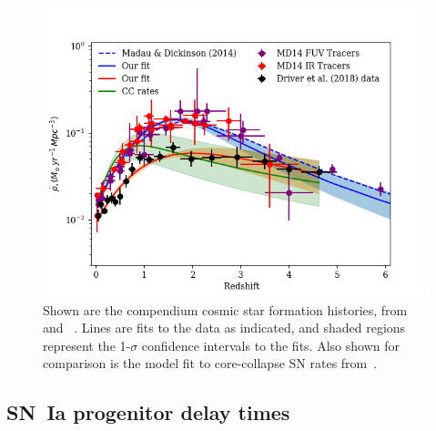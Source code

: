 \documentclass[apj]{aastex}
\begin{document}
\begin{figure}[t]
   \centering
   \includegraphics[width=6.1in]{figure_csfh_today}
   \caption{\footnotesize Shown are the compendium cosmic star formation histories, from ~\cite{Madau:2014fk} and ~\cite{Driver:2018nr}. Lines are fits to the data as indicated, and shaded regions represent the 1-$\sigma$ confidence intervals to the fits. Also shown for comparison is the model fit to core-collapse SN rates from~\cite{Strolger:2015aa}.}
   \label{fig:csfhs}
\end{figure}



\subsection{SN~Ia progenitor delay times}
\end{document}
